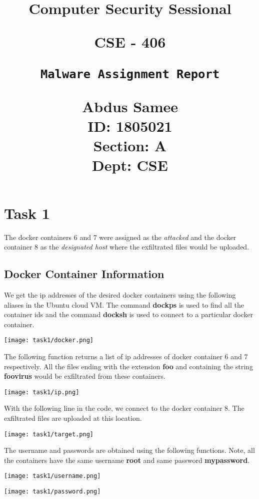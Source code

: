 \documentclass{article}
\title{%
  \begin{center}
        \vspace*{1cm}
            
        \Huge
        \textbf{Computer Security Sessional}
            
        \vspace{0.5cm}
        \LARGE
        CSE - 406
            
        \vspace{2cm}
            
        \Huge
        \texttt{Malware Assignment Report}
                        
        \vspace{0.8cm}
                        
        \Large
        Abdus Samee\\
        ID: 1805021\\
        Section: A\\
        Dept: CSE\\
    \end{center}
  }
\date{}
\begin{document}
\maketitle
\newpage

\section{Task 1}
The docker containers $6$ and $7$ were assigned as the \textit{attacked} and the docker container $8$ as the \textit{designated host} where the exfiltrated files would be uploaded.\\

\subsection{Docker Container Information}
We get the ip addresses of the desired docker containers using the following aliases in the Ubuntu cloud VM. The command \textbf{dockps} is used to find all the container ids and the command \textbf{docksh} is used to connect to a particular docker container.
\begin{center}
    \texttt{[image: task1/docker.png]}
\end{center}

The following function returns a list of ip addresses of docker container $6$ and $7$ respectively. All the files ending with the extension \textbf{foo} and containing the string \textbf{foovirus} would be exfiltrated from these containers.
\begin{center}
    \texttt{[image: task1/ip.png]}
\end{center}

With the following line in the code, we connect to the docker container $8$. The exfiltrated files are uploaded at this location.
\begin{center}
    \texttt{[image: task1/target.png]}
\end{center}

The username and passwords are obtained using the following functions. Note, all the containers have the same username \textbf{root} and same password \textbf{mypassword}.
\begin{center}
    \texttt{[image: task1/username.png]}
\end{center}
\begin{center}
    \texttt{[image: task1/password.png]}
\end{center}
\end{document}
